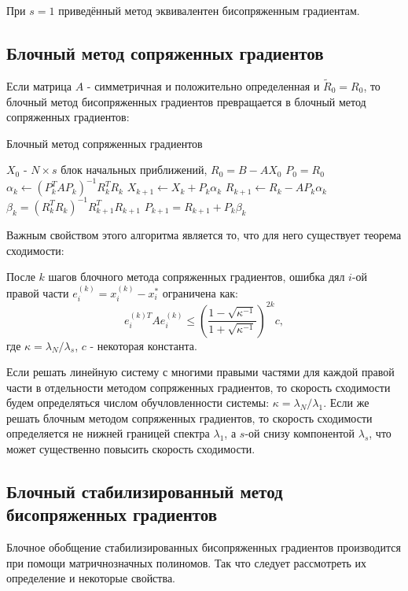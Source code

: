 При $s=1$ приведённый метод эквивалентен бисопряженным градиентам. 

\subsection[Блочный метод сопряженных градиентов]{Блочный метод сопряженных градиентов \cite{OLEARY1980293}}
Если матрица $A$ - симметричная и положительно определенная и $\tilde{R}_0 = R_0$, 
то блочный метод бисопряженных градиентов превращается в блочный метод сопряженных градиентов:
\begin{algorithm}   
    \caption{Блочный метод сопряженных градиентов}
    \begin{algorithmic}
        \State $X_0$ - $N \times s$ блок начальных приближений, $R_0 = B - AX_0$
        \State $P_0 = R_0$
            \State $\alpha_k \gets (P_k^T A P_k)^{-1} R_k^T R_k$
            \State $X_{k+1} \gets X_k + P_k \alpha_k$
            \State $R_{k+1} \gets R_k - A P_k \alpha_k$
            \State $\beta_k = (R_k^T R_k)^{-1} R_{k+1}^T R_{k+1}$
            \State $P_{k+1} = R_{k+1} + P_k \beta_k$
        \EndFor 
    \end{algorithmic}
\end{algorithm}
Важным свойством этого алгоритма является то, что для него существует теорема сходимости:
\begin{theorem}
    После  $k$ шагов блочного метода сопряженных градиентов, ошибка дял $i$-ой правой части $e^{(k)}_i = x_i^{(k)} - x_i^*$ ограничена как:
    \begin{equation}
        e^{(k)T}_i A e^{(k)}_i \leq \left( \frac{1 - \sqrt{\kappa^{-1}}}{1 + \sqrt{\kappa^{-1}}} \right)^{2k} c, 
    \end{equation}
    где $\kappa = \lambda_N/\lambda_s$, $c$ - некоторая константа.
\end{theorem}
Если решать линейную систему с многими правыми частями для каждой правой части в отдельности
методом сопряженных градиентов, то скорость сходимости будем определяться числом
обучловленности системы: $\kappa = \lambda_N / \lambda_1$. Если же решать блочным методом
сопряженных градиентов, то скорость сходимости определяется не нижней границей спектра $\lambda_1$,
а $s$-ой снизу компонентой $\lambda_s$, что может существенно повысить скорость сходимости. 

\subsection[Блочный стабилизированный метод бисопряженных градиентов]{Блочный стабилизированный метод бисопряженных градиентов \cite{elGuennouni2003}}
Блочное обобщение стабилизированных бисопряженных градиентов производится при помощи
 матричнозначных полиномов. Так что следует рассмотреть их определение и некоторые свойства. 
